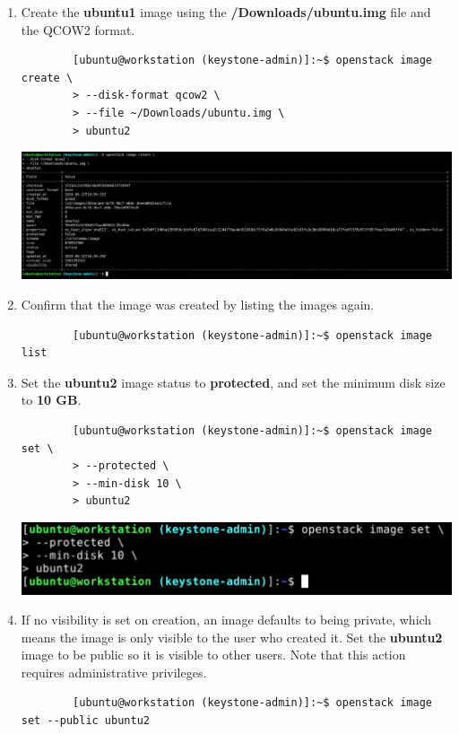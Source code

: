 \documentclass[letterpaper, 12pt]{article}
\begin{document}
\begin{enumerate}
    \item Create the \textbf{ubuntu1} image using the \textbf{\texttildemid/Downloads/ubuntu.img} file and the QCOW2
    format.
    \begin{lstlisting}
        [ubuntu@workstation (keystone-admin)]:~$ openstack image create \
        > --disk-format qcow2 \
        > --file ~/Downloads/ubuntu.img \
        > ubuntu2
    \end{lstlisting}

    \begin{center}
        \includegraphics[width=\linewidth]{images/part1/step19.png}
    \end{center}

    \item Confirm that the image was created by listing the images again.
    \begin{lstlisting}
        [ubuntu@workstation (keystone-admin)]:~$ openstack image list
    \end{lstlisting}

    \item Set the \textbf{ubuntu2} image status to \textbf{protected}, and set the minimum disk size to \textbf{10 GB}.
    \begin{lstlisting}
        [ubuntu@workstation (keystone-admin)]:~$ openstack image set \
        > --protected \
        > --min-disk 10 \
        > ubuntu2
    \end{lstlisting}

    \begin{center}
        \includegraphics[width=\linewidth]{images/part1/step21.png}
    \end{center}

    \item If no visibility is set on creation, an image defaults to being private, which means the image is only visible
    to the user who created it. Set the \textbf{ubuntu2} image to be public so it is visible to other users. Note that
    this action requires administrative privileges.
    \begin{lstlisting}
        [ubuntu@workstation (keystone-admin)]:~$ openstack image set --public ubuntu2
    \end{lstlisting}


\end{enumerate}
\end{document}
